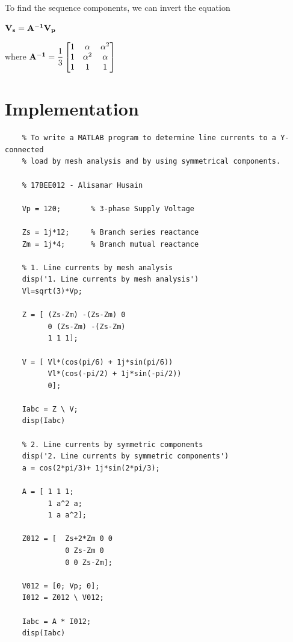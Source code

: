 \documentclass[a4paper,12pt]{article}
\begin{document}
    To find the sequence components, we can invert the equation
    \begin{center}
      $ \bf V_s = A^{-1} V_p $
    \end{center}

    \begin{center}
      where
      \begin{math}
        {\bf A^{-1}} =
        \dfrac{1}{3}
        \begin{bmatrix}
          1 & \alpha   & \alpha^2 \\
          1 & \alpha^2 & \alpha \\
          1 & 1        & 1
        \end{bmatrix}
      \end{math}
    \end{center}

  \pagebreak
  \section{Implementation}
  \begin{lstlisting}
    % To write a MATLAB program to determine line currents to a Y-connected 
    % load by mesh analysis and by using symmetrical components.

    % 17BEE012 - Alisamar Husain

    Vp = 120;       % 3-phase Supply Voltage
    
    Zs = 1j*12;     % Branch series reactance
    Zm = 1j*4;      % Branch mutual reactance

    % 1. Line currents by mesh analysis
    disp('1. Line currents by mesh analysis')
    Vl=sqrt(3)*Vp;

    Z = [ (Zs-Zm) -(Zs-Zm) 0
          0 (Zs-Zm) -(Zs-Zm)
          1 1 1];

    V = [ Vl*(cos(pi/6) + 1j*sin(pi/6))
          Vl*(cos(-pi/2) + 1j*sin(-pi/2))
          0];

    Iabc = Z \ V;
    disp(Iabc)

    % 2. Line currents by symmetric components
    disp('2. Line currents by symmetric components')
    a = cos(2*pi/3)+ 1j*sin(2*pi/3);

    A = [ 1 1 1; 
          1 a^2 a; 
          1 a a^2];
      
    Z012 = [  Zs+2*Zm 0 0
              0 Zs-Zm 0
              0 0 Zs-Zm];

    V012 = [0; Vp; 0];
    I012 = Z012 \ V012;

    Iabc = A * I012;
    disp(Iabc)
  \end{lstlisting}
\end{document}
